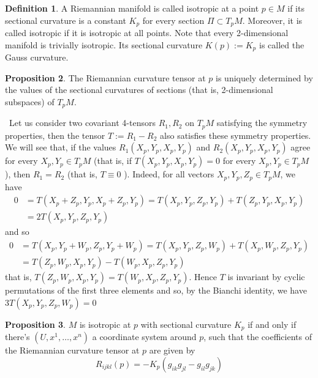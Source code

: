 \documentclass[12pt,a4paper]{book}
\newenvironment{prooff}{{\noindent\it\textcolor{cyan!40!black}{Proof}:}\,}{\par}
\theoremstyle{definition}
\newtheorem{defn}{Definition}[section]
\newtheorem{prop}[defn]{Proposition}
\begin{document}
\begin{defn}
    A Riemannian manifold is called isotropic at a point $p \in M$ if its sectional curvature is a constant $K_p$ for every section $\Pi \subset T_p M$.
    Moreover, it is called isotropic if it is isotropic at all points.
    Note that every 2-dimensional manifold is trivially isotropic. Its sectional curvature $K(p):=K_p$ is called the Gauss curvature.
\end{defn}
\begin{prop}
    The Riemannian curvature tensor at $p$ is uniquely determined
    by the values of the sectional curvatures of sections (that is, 2-dimensional subspaces) of $T_p M$.
\end{prop}
\begin{prooff}
    Let us consider two covariant 4-tensors $R_1, R_2$ on $T_p M$ satisfying the symmetry properties,
    then the tensor $T:=R_1-R_2$ also satisfies these symmetry properties. We will see that, if the values $R_1\left(X_p, Y_p, X_p, Y_p\right)$ and $R_2\left(X_p, Y_p, X_p, Y_p\right)$ agree for every $X_p, Y_p \in T_p M$ (that is, if $T\left(X_p, Y_p, X_p, Y_p\right)=0$ for every $X_p, Y_p \in T_p M$ ), then $R_1=R_2$ (that is, $T \equiv 0$ ). Indeed, for all vectors $X_p, Y_p, Z_p \in T_p M$, we have
    $$
        \begin{aligned}
            0 & =T\left(X_p+Z_p, Y_p, X_p+Z_p, Y_p\right)=T\left(X_p, Y_p, Z_p, Y_p\right)+T\left(Z_p, Y_p, X_p, Y_p\right) \\
              & =2 T\left(X_p, Y_p, Z_p, Y_p\right)
        \end{aligned}
    $$
    and so
    $$
        \begin{aligned}
            0 & =T\left(X_p, Y_p+W_p, Z_p, Y_p+W_p\right)=T\left(X_p, Y_p, Z_p, W_p\right)+T\left(X_p, W_p, Z_p, Y_p\right) \\
              & =T\left(Z_p, W_p, X_p, Y_p\right)-T\left(W_p, X_p, Z_p, Y_p\right)
        \end{aligned}
    $$
    that is, $T\left(Z_p, W_p, X_p, Y_p\right)=T\left(W_p, X_p, Z_p, Y_p\right)$. Hence $T$ is invariant by cyclic permutations of the first three elements and so, by the Bianchi identity, we have $3 T\left(X_p, Y_p, Z_p, W_p\right)=0$
\end{prooff}
\begin{prop}
    $M$ is isotropic at $p$ with sectional curvature $K_p$ if and only if there's $(U,x^1,\dots,x^n)$ a coordinate system around $p$,
    such that the coefficients of the Riemannian curvature tensor at $p$ are given by
    $$
        R_{i j k l}(p)=-K_p\left(g_{i k} g_{j l}-g_{i l} g_{j k}\right)
    $$
\end{prop}
\end{document}
